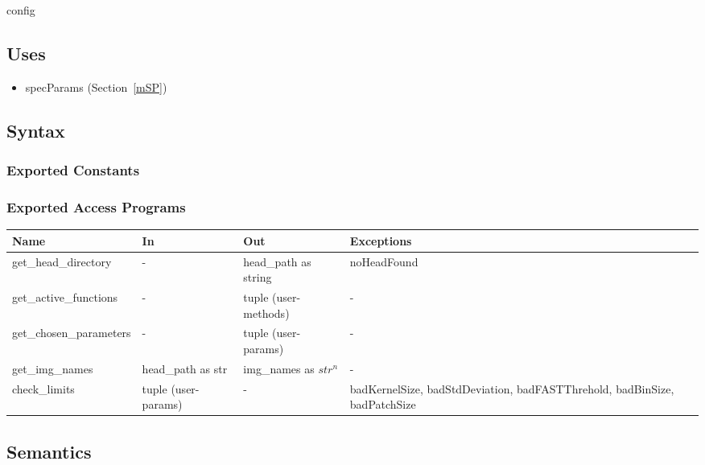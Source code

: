 \documentclass[12pt, titlepage]{article}
\begin{document}
config

\subsection{Uses}
\begin{itemize}
\item specParams (Section~\ref{mSP})
\end{itemize}

\subsection{Syntax}

\subsubsection{Exported Constants}

\subsubsection{Exported Access Programs}
\begin{tabular}{p{4cm} p{4cm} p{4cm} p{3.5cm}}
\hline
\textbf{Name} & \textbf{In} & \textbf{Out} & \textbf{Exceptions} \\
\hline
get\_head\_directory & - & head\_path as string & noHeadFound \\
\hline
get\_active\_functions & - & tuple (user-methods) & - \\
\hline
get\_chosen\_parameters & - & tuple (user-params) & - \\
\hline
get\_img\_names & head\_path as str & img\_names as $str^{n}$ & - \\
\hline
check\_limits & tuple (user-params) & - & 
badKernelSize, \newline badStdDeviation, \newline
badFASTThrehold, \newline badBinSize, \newline
badPatchSize\\
\hline
\end{tabular}


\subsection{Semantics}
\end{document}
